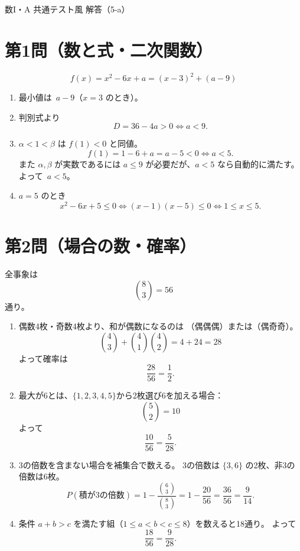 \documentclass[a4paper,12pt]{ltjsarticle}
\begin{document}
\begin{center}
{\LARGE 数I・A 共通テスト風 解答（5-a）}
\end{center}

\vspace{1em}

\section*{第1問（数と式・二次関数）}
\[
f(x)=x^2-6x+a=(x-3)^2+(a-9)
\]
\begin{enumerate}[label=\arabic*.]
  \item 最小値は \(\,a-9\)（\(x=3\) のとき）。
  \item 判別式より
  \[
  D=36-4a>0 \iff a<9.
  \]
  \item \(\alpha<1<\beta\) は \(f(1)<0\) と同値。
  \[
  f(1)=1-6+a=a-5<0 \iff a<5.
  \]
  また \(\alpha,\beta\) が実数であるには \(a\le 9\) が必要だが、\(a<5\) なら自動的に満たす。  
  よって \(\,a<5\)。
  \item \(a=5\) のとき
  \[
  x^2-6x+5\le0
  \iff (x-1)(x-5)\le0
  \iff 1\le x\le5.
  \]
\end{enumerate}

\section*{第2問（場合の数・確率）}
全事象は
\[
{8 \choose 3}=56
\]
通り。
\begin{enumerate}[label=\arabic*.]
  \item 偶数4枚・奇数4枚より、和が偶数になるのは  
  （偶偶偶）または（偶奇奇）。
  \[
  {4 \choose 3}+{4 \choose 1}{4 \choose 2}=4+24=28
  \]
  よって確率は
  \[
  \frac{28}{56}=\frac12.
  \]
  \item 最大が6とは、\(\{1,2,3,4,5\}\)から2枚選び6を加える場合：
  \[
  {5 \choose 2}=10
  \]
  よって
  \[
  \frac{10}{56}=\frac{5}{28}.
  \]
  \item 3の倍数を含まない場合を補集合で数える。  
  3の倍数は \(\{3,6\}\) の2枚、非3の倍数は6枚。
  \[
  P(\text{積が3の倍数})=1-\frac{{6 \choose 3}}{{8 \choose 3}}
  =1-\frac{20}{56}
  =\frac{36}{56}
  =\frac{9}{14}.
  \]
  \item 条件 \(a+b>c\) を満たす組（\(1\le a<b<c\le 8\)）を数えると18通り。  
  よって
  \[
  \frac{18}{56}=\frac{9}{28}.
  \]
\end{enumerate}
\end{document}
